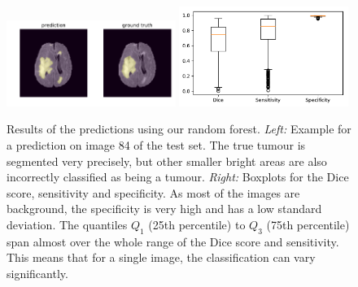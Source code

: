 \documentclass[final]{article}
\begin{document}
\begin{figure}[h]
\includegraphics[width=0.49\textwidth]{rf_prediction_84}
\includegraphics[width=0.49\textwidth]{boxplot_rf}
\caption{Results of the predictions using our random forest. \textit{Left:} Example for a prediction on image 84 of the test set.
The true tumour is segmented very precisely, but other smaller bright areas are
also incorrectly classified as being a tumour. \textit{Right:} Boxplots for the
Dice score, sensitivity and specificity. As most of the images are background,
the specificity is very high and has a low standard deviation. The quantiles
$Q_1$ (25th percentile) to $Q_3$ (75th percentile) span almost over the whole
range of the Dice score and sensitivity. This means that for a single image,
the classification can vary significantly.}
\label{fig:rfresults}
\end{figure}
\end{document}
